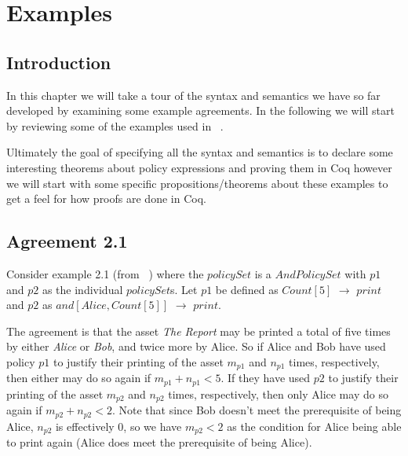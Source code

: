 \chapter{Examples}

\section{Introduction}


In this chapter we will take a tour of the syntax and semantics we have so far developed by examining some example agreements. In the following we will start by reviewing some of the examples used in ~\cite{pucella2006}.

Ultimately the goal of specifying all the syntax and semantics is to declare some interesting theorems about policy expressions and proving them in Coq however we will start with some specific propositions/theorems about these examples to get a feel for how proofs are done in Coq.

\section{Agreement 2.1}

Consider example 2.1 (from ~\cite{pucella2006}) where the $policySet$ is a $AndPolicySet$ with $p1$ and $p2$ as the individual $policySet$s. Let $p1$ be defined as $Count[5]$ $\rightarrow$ $print$ and $p2$ as $and[Alice, Count[5]]$ $\rightarrow$ $print$. 

The agreement is that the asset \emph{The Report} may be printed a total of five times by either \emph{Alice} or \emph{Bob}, and twice more by Alice. So if Alice and Bob have used policy $p1$ to justify their printing of the asset $m_{p1}$ and $n_{p1}$ times, respectively, then either may do so again if $m_{p1} + n_{p1} < 5$. If they have used $p2$ to justify their printing of the asset $m_{p2}$ and $n_{p2}$ times, respectively, then only Alice may do so again if $m_{p2} + n_{p2} < 2$. Note that since Bob doesn't meet the prerequisite of being Alice, $n_{p2}$ is effectively $0$, so we have $m_{p2} < 2$ as the condition for Alice being able to print again (Alice does meet the prerequisite of being Alice).

